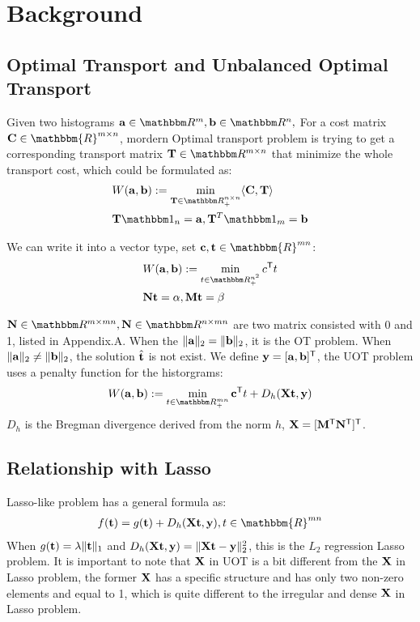 \section{Background}
\subsection{Optimal Transport and Unbalanced Optimal Transport}
Given two histograms $\ma\in \R^{m}, \mb \in \R^{n},$ For a cost matrix $\C \in \mathbbm{R}^{m \times n}$, mordern Optimal transport problem is trying to get a corresponding transport matrix $\T \in \R^{m \times n}$ that minimize the whole transport cost, which could be formulated as:
$$
\begin{aligned}
&W(\ma,\mb) := \min_{ \T \in \R_{+}^{n \times n}} \langle \C, \T \rangle \\
& \mathbf{T} \one_n= \ma, \mathbf{T}^{T}\one_m = \mb
\end{aligned}
$$

We can write it into a vector type, set $\vc,\vt \in \mathbbm{R}^{mn}$:
$$
\begin{aligned}
&W(\ma,\mb) := \min_{t \in \R_{+}^{n^2}} c^{\tranT}t \\
& \mathbf{N}\vt = \alpha, \mathbf{M}\vt = \beta
\end{aligned}
$$

$\mathbf{N} \in \R^{m \times mn}, \mathbf{N} \in \R^{n \times mn}$ are two matrix consisted with 0 and 1, listed in Appendix.A. When the $\|\mathbf{a}\|_2 = \|\mathbf{b}\|_2$, it is the OT problem. When $\|\mathbf{a}\|_2 \neq \|\mathbf{b}\|_2$, the solution $\hat{\mathbf t}$ is not exist. We define $\mathbf y = [\mathbf{a}, \mathbf{b}]^{\mathsf T}$, the UOT problem uses a penalty function for the historgrams: 
\begin{equation}
\label{eq:uot}
W(\ma,\mb) := \min_{t \in \R_{+}^{mn}} \vc^{\tranT}t + D_h(\X\vt,\y)
\end{equation}
$D_h$ is the Bregman divergence derived from the norm $h$, $\mathbf{X} = [\mathbf{M}^{\mathsf T} \mathbf{N}^{\mathsf T}]^{\mathsf T}$. 

\subsection{Relationship with Lasso}
Lasso-like problem has a general formula as:
$$
\begin{aligned}
f(\vt) = g(\vt) + D_h(\X \vt,\y), t\in \mathbbm{R}^{mn}
\end{aligned}
$$
When $g(\mathbf t) = \lambda \|\mathbf t\|_1$ and $D_h(\mathbf{X} \mathbf t,\mathbf y) = \|\mathbf{X} \mathbf t-\mathbf y\|_2^2$, this is the $L_2$ regression Lasso problem. It is important to note that $\mathbf{X}$ in UOT is a bit different from the $\mathbf{X}$ in Lasso problem, the former $\mathbf{X}$ has a specific structure and has only two non-zero elements and equal to 1, which is quite different to the irregular and dense $\mathbf{X}$ in Lasso problem.


